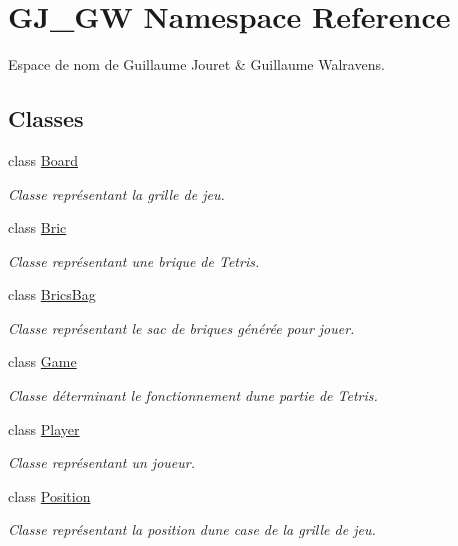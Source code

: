 \hypertarget{namespace_g_j___g_w}{}\section{G\+J\+\_\+\+GW Namespace Reference}
\label{namespace_g_j___g_w}


Espace de nom de Guillaume Jouret \& Guillaume Walravens.  


\subsection*{Classes}
\begin{DoxyCompactItemize}
\item 
class \hyperlink{class_g_j___g_w_1_1_board}{Board}
\begin{DoxyCompactList}\small\item\em Classe représentant la grille de jeu. \end{DoxyCompactList}\item 
class \hyperlink{class_g_j___g_w_1_1_bric}{Bric}
\begin{DoxyCompactList}\small\item\em Classe représentant une brique de Tetris. \end{DoxyCompactList}\item 
class \hyperlink{class_g_j___g_w_1_1_brics_bag}{Brics\+Bag}
\begin{DoxyCompactList}\small\item\em Classe représentant le sac de briques générée pour jouer. \end{DoxyCompactList}\item 
class \hyperlink{class_g_j___g_w_1_1_game}{Game}
\begin{DoxyCompactList}\small\item\em Classe déterminant le fonctionnement d\textquotesingle{}une partie de Tetris. \end{DoxyCompactList}\item 
class \hyperlink{class_g_j___g_w_1_1_player}{Player}
\begin{DoxyCompactList}\small\item\em Classe représentant un joueur. \end{DoxyCompactList}\item 
class \hyperlink{class_g_j___g_w_1_1_position}{Position}
\begin{DoxyCompactList}\small\item\em Classe représentant la position d\textquotesingle{}une case de la grille de jeu. \end{DoxyCompactList}\end{DoxyCompactItemize}
